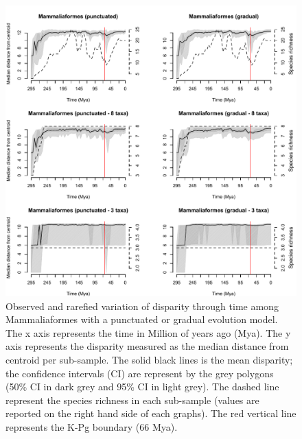 \documentclass[12pt,letterpaper]{article}
\begin{document}
\begin{figure}[!htbp]
\centering
    \includegraphics[keepaspectratio=true]{Figures/Slater_full.pdf}
\caption{Observed and rarefied variation of disparity through time among Mammaliaformes with a punctuated or gradual evolution model. The x axis represents the time in Million of years ago (Mya). The y axis represents the disparity measured as the median distance from centroid per sub-sample. The solid black lines is the mean disparity; the confidence intervals (CI) are represent by the grey polygons (50\% CI in dark grey and 95\% CI in light grey). The dashed line represent the species richness in each sub-sample (values are reported on the right hand side of each graphs). The red vertical line represents the K-Pg boundary (66 Mya).}
\end{figure}
\end{document}
